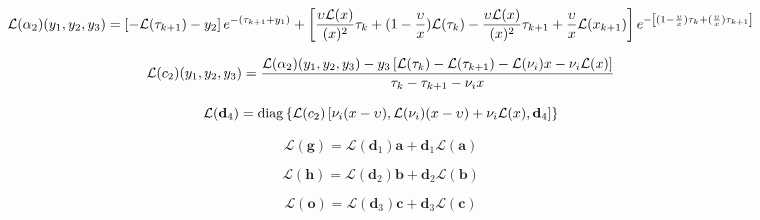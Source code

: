\begin{adjustwidth}{-1.25in}{-1.25in}
\center
\begin{equation}
\mathcal{L}(\alpha_{2})(y_{1}, y_{2}, y_{3}) = \left[-\mathcal{L}(\tau_{k+1}) - y_{2}\right] e^{-(\tau_{k+1} + y_{1})} + \left[\frac{\upsilon \mathcal{L}(x)}{(x)^{2}}\tau_{k} + (1 - \frac{\upsilon}{x})\mathcal{L}(\tau_{k}) - \frac{\upsilon \mathcal{L}(x)}{(x)^{2}}\tau_{k+1} + \frac{\upsilon}{x}\mathcal{L}(x_{k+1})\right] e^{-\left[(1 - \frac{\upsilon}{x})\tau_{k} + (\frac{\upsilon}{x})\tau_{k+1}\right]}
\label{eq:mem-radiance_at_optical_depth-tangent_linear-alpha2_l}
\end{equation}
\end{adjustwidth}

\begin{equation}
\mathcal{L}(c_{2})(y_{1}, y_{2}, y_{3}) = \frac{\mathcal{L}(\alpha_{2})(y_{1}, y_{2}, y_{3}) - y_{3}\left[\mathcal{L}(\tau_{k}) - \mathcal{L}(\tau_{k+1}) - \mathcal{L}(\nu_{i})x - \nu_{i}\mathcal{L}(x)\right]}{\tau_{k} - \tau_{k+1} - \nu_{i}x}
\label{eq:mem-radiance_at_optical_depth-tangent_linear-c2_l}
\end{equation}

\begin{equation}
\mathcal{L}(\mathbf{d}_{4}) = \mathrm{diag}\left\{\mathcal{L}(c_{2})\left[\nu_{i}(x - \upsilon), \mathcal{L}(\nu_{i})(x - \upsilon) + \nu_{i}\mathcal{L}(x), \mathbf{d}_{4}\right]\right\}
\label{eq:mem-radiance_at_optical_depth-tangent_linear-d4_l}
\end{equation}

\begin{equation}
\mathcal{L}(\mathbf{g}) = \mathcal{L}(\mathbf{d}_{1})\mathbf{a} + \mathbf{d}_{1}\mathcal{L}(\mathbf{a})
\label{eq:mem-radiance_at_optical_depth-tangent_linear-g_l}
\end{equation}

\begin{equation}
\mathcal{L}(\mathbf{h}) = \mathcal{L}(\mathbf{d}_{2})\mathbf{b} + \mathbf{d}_{2}\mathcal{L}(\mathbf{b})
\label{eq:mem-radiance_at_optical_depth-tangent_linear-h_l}
\end{equation}

\begin{equation}
\mathcal{L}(\mathbf{o}) = \mathcal{L}(\mathbf{d}_{3})\mathbf{c} + \mathbf{d}_{3}\mathcal{L}(\mathbf{c})
\label{eq:mem-radiance_at_optical_depth-tangent_linear-o_l}
\end{equation}

